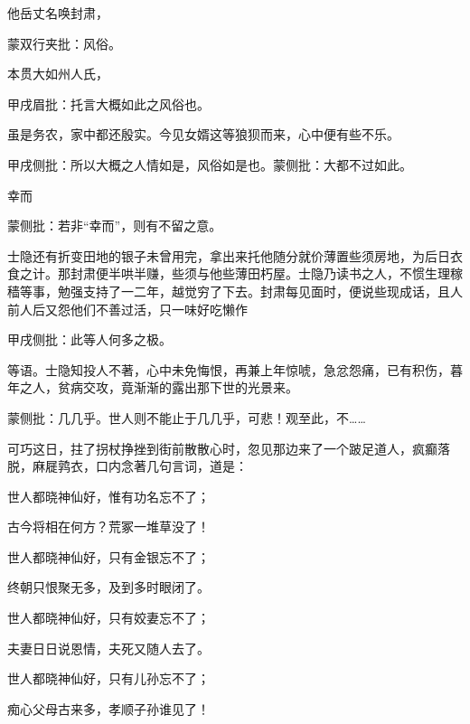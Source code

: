 \begin{parag}
    他岳丈名唤封肃，\begin{note}蒙双行夹批：风俗。\end{note}本贯大如州人氏，\begin{note}甲戌眉批：托言大概如此之风俗也。\end{note}虽是务农，家中都还殷实。今见女婿这等狼狈而来，心中便有些不乐。\begin{note}甲戌侧批：所以大概之人情如是，风俗如是也。蒙侧批：大都不过如此。\end{note}幸而\begin{note}蒙侧批：若非“幸而”，则有不留之意。\end{note}士隐还有折变田地的银子未曾用完，拿出来托他随分就价薄置些须房地，为后日衣食之计。那封肃便半哄半赚，些须与他些薄田朽屋。士隐乃读书之人，不惯生理稼穑等事，勉强支持了一二年，越觉穷了下去。封肃每见面时，便说些现成话，且人前人后又怨他们不善过活，只一味好吃懒作\begin{note}甲戌侧批：此等人何多之极。\end{note}等语。士隐知投人不著，心中未免悔恨，再兼上年惊唬，急忿怨痛，已有积伤，暮年之人，贫病交攻，竟渐渐的露出那下世的光景来。\begin{note}蒙侧批：几几乎。世人则不能止于几几乎，可悲！观至此，不……\end{note}
\end{parag}


\begin{parag}
    可巧这日，拄了拐杖挣挫到街前散散心时，忽见那边来了一个跛足道人，疯癫落脱，麻屣鹑衣，口内念著几句言词，道是：
\end{parag}


\begin{poem}

    \begin{pl}
        世人都晓神仙好，惟有功名忘不了；\end{pl}

    \begin{pl}
        古今将相在何方？荒冢一堆草没了！\end{pl}

    \begin{pl}
        世人都晓神仙好，只有金银忘不了；\end{pl}

    \begin{pl}
        终朝只恨聚无多，及到多时眼闭了。\end{pl}

    \begin{pl}
        世人都晓神仙好，只有姣妻忘不了；\end{pl}

    \begin{pl}
        夫妻日日说恩情，夫死又随人去了。\end{pl}

    \begin{pl}
        世人都晓神仙好，只有儿孙忘不了；\end{pl}

    \begin{pl}
        痴心父母古来多，孝顺子孙谁见了！\end{pl}
\end{poem}

